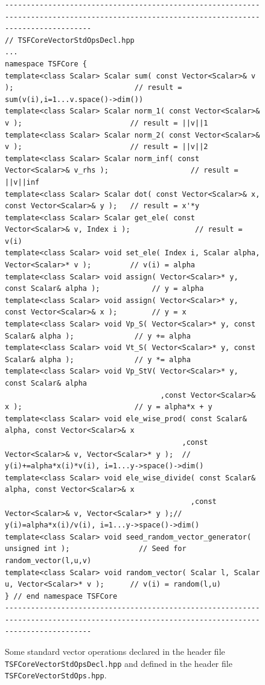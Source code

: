 \documentclass[10pt,fleqn]{article}
\begin{document}
{\bsinglespace
\begin{figure}
\begin{minipage}{\textwidth}
{\scriptsize\begin{verbatim}
------------------------------------------------------------------------------------------------------------------------------------------
// TSFCoreVectorStdOpsDecl.hpp
...
namespace TSFCore {
template<class Scalar> Scalar sum( const Vector<Scalar>& v );                            // result = sum(v(i),i=1...v.space()->dim())
template<class Scalar> Scalar norm_1( const Vector<Scalar>& v );                         // result = ||v||1
template<class Scalar> Scalar norm_2( const Vector<Scalar>& v );                         // result = ||v||2
template<class Scalar> Scalar norm_inf( const Vector<Scalar>& v_rhs );                   // result = ||v||inf
template<class Scalar> Scalar dot( const Vector<Scalar>& x, const Vector<Scalar>& y );   // result = x'*y
template<class Scalar> Scalar get_ele( const Vector<Scalar>& v, Index i );               // result = v(i)
template<class Scalar> void set_ele( Index i, Scalar alpha, Vector<Scalar>* v );         // v(i) = alpha
template<class Scalar> void assign( Vector<Scalar>* y, const Scalar& alpha );            // y = alpha
template<class Scalar> void assign( Vector<Scalar>* y, const Vector<Scalar>& x );        // y = x
template<class Scalar> void Vp_S( Vector<Scalar>* y, const Scalar& alpha );              // y += alpha
template<class Scalar> void Vt_S( Vector<Scalar>* y, const Scalar& alpha );              // y *= alpha
template<class Scalar> void Vp_StV( Vector<Scalar>* y, const Scalar& alpha
                                    ,const Vector<Scalar>& x );                          // y = alpha*x + y
template<class Scalar> void ele_wise_prod( const Scalar& alpha, const Vector<Scalar>& x
                                         ,const Vector<Scalar>& v, Vector<Scalar>* y );  // y(i)+=alpha*x(i)*v(i), i=1...y->space()->dim()
template<class Scalar> void ele_wise_divide( const Scalar& alpha, const Vector<Scalar>& x
                                           ,const Vector<Scalar>& v, Vector<Scalar>* y );// y(i)=alpha*x(i)/v(i), i=1...y->space()->dim()
template<class Scalar> void seed_random_vector_generator( unsigned int );                // Seed for random_vector(l,u,v)
template<class Scalar> void random_vector( Scalar l, Scalar u, Vector<Scalar>* v );      // v(i) = random(l,u)
} // end namespace TSFCore
------------------------------------------------------------------------------------------------------------------------------------------
\end{verbatim}}
\end{minipage}
\caption{
\label{tsfcore:fig:std_vec_ops}
Some standard vector operations declared in the header file \texttt{TSFCoreVectorStdOpsDecl.hpp}
and defined in the header file \texttt{TSFCoreVectorStdOps.hpp}.
}
\end{figure}
\esinglespace}
\end{document}
